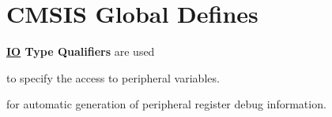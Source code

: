 \hypertarget{group__CMSIS__glob__defs}{}\section{C\+M\+S\+IS Global Defines}
\label{group__CMSIS__glob__defs}
{\bfseries{\mbox{\hyperlink{structIO}{IO}} Type Qualifiers}} are used \begin{DoxyItemize}
\item to specify the access to peripheral variables. \item for automatic generation of peripheral register debug information. \end{DoxyItemize}
